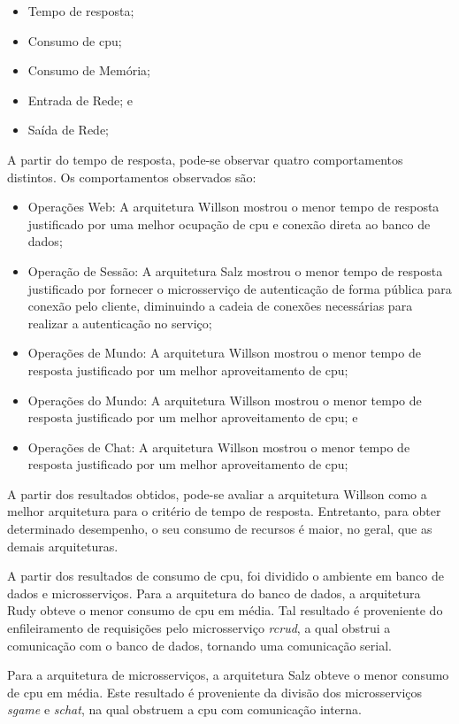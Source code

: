 \begin{itemize}
 \item Tempo de resposta;
 \item Consumo de \ac{cpu};
 \item Consumo de Memória;
 \item Entrada de Rede; e
 \item Saída de Rede;
\end{itemize}

A partir do tempo de resposta, pode-se observar quatro comportamentos distintos.
%
Os comportamentos observados são:

\begin{itemize}
 \item Operações Web: A arquitetura Willson mostrou o menor tempo de resposta justificado por uma melhor ocupação de \ac{cpu} e conexão direta ao banco de dados;
 \item Operação de Sessão: A arquitetura Salz mostrou o menor tempo de resposta justificado por fornecer o microsserviço de autenticação de forma pública para conexão pelo cliente, diminuindo a cadeia de conexões necessárias para realizar a autenticação no serviço;
 \item Operações de Mundo: A arquitetura Willson mostrou o menor tempo de resposta justificado por um melhor aproveitamento de \ac{cpu};
 \item Operações do Mundo: A arquitetura Willson mostrou o menor tempo de resposta justificado por um melhor aproveitamento de \ac{cpu}; e
 \item Operações de Chat: A arquitetura Willson mostrou o menor tempo de resposta justificado por um melhor aproveitamento de \ac{cpu};
\end{itemize}

A partir dos resultados obtidos, pode-se avaliar a arquitetura Willson como a melhor arquitetura para o critério de tempo de resposta.
%
Entretanto, para obter determinado desempenho, o seu consumo de recursos é maior, no geral, que as demais arquiteturas.


A partir dos resultados de consumo de \ac{cpu}, foi dividido o ambiente em banco de dados e microsserviços.
%
Para a arquitetura do banco de dados, a arquitetura Rudy obteve o menor consumo de \ac{cpu} em média.
%
Tal resultado é proveniente do enfileiramento de requisições pelo microsserviço \textit{rcrud}, a qual obstrui a comunicação com o banco de dados, tornando uma comunicação serial.

Para a arquitetura de microsserviços, a arquitetura Salz obteve o menor consumo de \ac{cpu} em média.
%
Este resultado é proveniente da divisão dos microsserviços \textit{sgame} e \textit{schat}, na qual obstruem a \ac{cpu} com comunicação interna.

